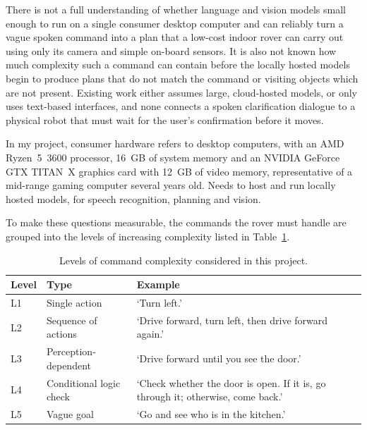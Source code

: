 \label{sec:problem-statement}

There is not a full understanding of whether language and vision models small enough to run on a single consumer
desktop computer and can reliably turn a vague spoken command
into a plan that a low-cost indoor rover can carry out using only its camera and simple on-board
sensors. It is also not known how much complexity such a command can contain before the locally
hosted models begin to produce plans that do not match the command or visiting objects which are not present.
Existing work either assumes large, cloud-hosted models, or only uses text-based interfaces, and none connects a
spoken clarification dialogue to a physical robot that must wait for the user's confirmation
before it moves.

In my project, consumer hardware refers to desktop computers, with an AMD Ryzen~5~3600
processor, 16~GB of system memory and an NVIDIA GeForce GTX TITAN~X graphics card with 12~GB of
video memory, representative of a mid-range gaming computer several years old. Needs to host and run locally
hosted models, for speech recognition, planning and vision. 

To make these questions measurable, the commands the rover must handle are grouped into the
levels of increasing complexity listed in Table~\ref{tab:command-levels}.

\begin{table}[htbp]
    \centering
    \caption{Levels of command complexity considered in this project.}
    \label{tab:command-levels}
    \begin{tabular}{llp{7cm}}
        \toprule
        Level & Type & Example \\
        \midrule
        L1 & Single action & `Turn left.' \\
        L2 & Sequence of actions & `Drive forward, turn left, then drive forward again.' \\
        L3 & Perception-dependent & `Drive forward until you see the door.' \\
        L4 & Conditional logic check & `Check whether the door is open. If it is, go through it; otherwise, come back.' \\
        L5 & Vague goal & `Go and see who is in the kitchen.' \\
        \bottomrule
    \end{tabular}
\end{table}

